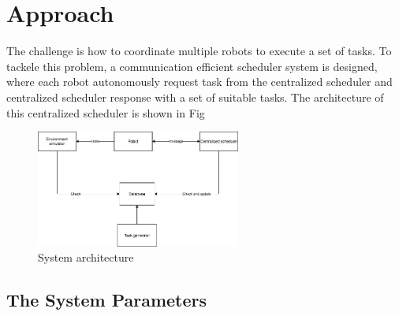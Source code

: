 \chapter{Approach}





The challenge is how to coordinate multiple robots to execute a set of tasks. To tackele this problem, a communication efficient scheduler system is designed, where each robot autonomously request task from the centralized scheduler and centralized scheduler response with a set of suitable tasks. The architecture of this centralized scheduler is shown in Fig


\begin{figure}
	\centering
	\includegraphics[width = 0.6\textwidth]{content/images/architecture.drawio.png}
	\caption{System architecture}
	\label{fig:system_architecture}
\end{figure}

\section{The System Parameters}

\item 
